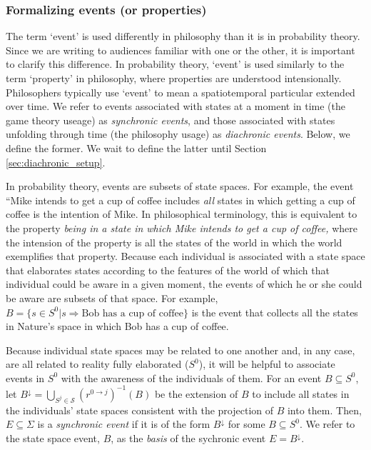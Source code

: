 \documentclass[
11pt,
titlepage,
reqno,
]{article}%
\theoremstyle{definition}
\begin{document}
	
\subsubsection{Formalizing events (or properties)}

The term `event' is used differently in philosophy than it is in probability theory. 
Since we are writing to audiences familiar with one or the other, it is important to clarify this difference. 
In probability theory, `event' is used similarly to the term `property' in philosophy, where properties are understood intensionally. 
Philosophers typically use `event' to mean a spatiotemporal particular extended over time. 
We refer to events associated with states at a moment in time (the game theory useage) as \textit{synchronic events}, and those associated with states unfolding through time (the philosophy usage) as \textit{diachronic events}.
Below, we define the former.
We wait to define the latter until Section \ref{sec:diachronic_setup}.
	
In probability theory, events are subsets of state spaces. 
For example, the event ``Mike intends to get a cup of coffee includes \textit{all} states in which getting a cup of coffee is the intention of Mike. 
In philosophical terminology, this is equivalent to the property \textit{being in a state in which Mike intends to get a cup of coffee,} where the intension of the property is all the states of the world in which the world exemplifies that property.
Because each individual is associated with a state space that elaborates states according to the features of the world of which that individual could be aware in a given moment, the events of which he or she could be aware are subsets of that space. 
For example, $B=\{s\in S^0|s\Rightarrow \text{Bob has a cup of coffee}\}$ is the event that collects all the states in Nature's space in which Bob has a cup of coffee.

Because individual state spaces may be related to one another and, in any case, are all related to reality fully elaborated ($S^0$), it will be helpful to associate events in $S^0$ with the awareness of the individuals of them.
For an event $B\subseteq S^0$, let $B^{\downarrow}=\bigcup_{S^j\in \mathcal{S}}\left(r^{0\rightarrow j}\right)^{-1}(B)$ be the extension of $B$ to include all states in the  individuals' state spaces consistent with the projection of $B$ into them.
Then, $E\subseteq \Sigma$ is a \textit{synchronic event} if it is of the form $B^{\downarrow}$ for some $B\subseteq S^0$.
We refer to the state space event, $B$, as the \textit{basis} of the sychronic event $E=B^{\downarrow}$.
	
\end{document}
